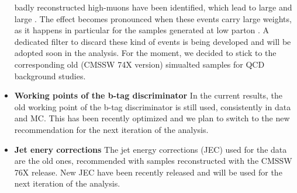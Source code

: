 \begin{itemize}
badly reconstructed high-\pt muons have been identified, which lead to large \MET and large \scalht. 
The effect becomes pronounced when these events carry large weights, as it happens in particular for the samples generated at low parton \scalht. 
A dedicated filter to discard these kind of events is being developed and will be adopted soon in the analysis. 
For the moment, we decided to stick to the corresponding old (CMSSW 74X version) simualted samples for QCD background studies. 
\item \textbf{Working points of the b-tag discriminator} In the current results, the old working point of the b-tag discriminator is still used, consistently in data and MC. This has been recently optimized and we plan to switch to the new recommendation for the next iteration of the analysis.
\item \textbf{Jet enery corrections} The jet energy corrections (JEC) used for the data are the old ones, recommended with samples reconstructed with the CMSSW 76X release. New JEC have been recently released and will be used for the next iteration of the analysis. 
\end{itemize}


